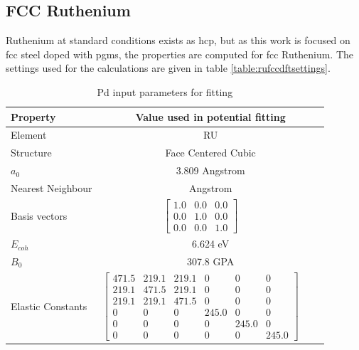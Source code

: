 \FloatBarrier
\subsection{FCC Ruthenium}
\label{section:fccferesults}


Ruthenium at standard conditions exists as \acrlong{hcp}, but as this work is focused on \acrshort{fcc} steel doped with \acrshort{pgm}s, the properties are computed for \acrshort{fcc} Ruthenium.  The settings used for the calculations are given in table \ref{table:rufccdftsettings}. 



\begin{table}[ht]
\renewcommand{\arraystretch}{1.2}
\begin{tabular}{lccc}
\hline\hline
Property & \multicolumn{3}{c}{Value used in potential fitting} \\
\hline\hline
Element & \multicolumn{3}{c}{RU}\\
Structure             & \multicolumn{3}{c}{Face Centered Cubic}\\
$a_0$                 & \multicolumn{3}{c}{3.809 Angstrom \cite{webelementspd}}\\
Nearest Neighbour     & \multicolumn{3}{c}{ Angstrom \cite{webelementspd}}\\
Basis vectors         & $\begin{bmatrix} 1.0 & 0.0 & 0.0 \\ 0.0 & 1.0 & 0.0 \\ 0.0 & 0.0 & 1.0  \end{bmatrix}$ \\
$E_{coh}$             & \multicolumn{3}{c}{6.624 eV \cite{semiempiricalpots}}   \\
$B_0$                 & \multicolumn{3}{c}{307.8 GPA \cite{semiempiricalpots}}   \\
Elastic Constants     & $\begin{bmatrix} 471.5 & 219.1 & 219.1 & 0 & 0 & 0 \\ 219.1 & 471.5 & 219.1 & 0 & 0 & 0 \\ 219.1 & 219.1 & 471.5 & 0 & 0 & 0 \\ 0 & 0 & 0 & 245.0 & 0 & 0 \\ 0 & 0 & 0 & 0 & 245.0 & 0 \\ 0 & 0 & 0 & 0 & 0 & 245.0 \end{bmatrix}$ \\
\hline\hline
\end{tabular}
\caption{Pd input parameters for fitting}
\label{table:ruinputparameters}
\end{table}






